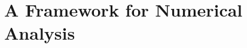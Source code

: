 \documentclass[11pt,a4paper]{article}
\numberwithin{equation}{section}
\begin{document}


\section{A Framework for Numerical Analysis}\label{Sec:anal}
\end{document}
